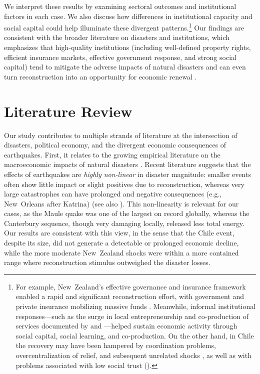 \documentclass[12pt]{article}
\begin{document}
We interpret these results by examining sectoral outcomes and institutional factors in each case. We also discuss how differences in institutional capacity and social capital could help illuminate these divergent patterns.\footnote{For example, New Zealand’s effective governance and insurance framework enabled a rapid and significant reconstruction effort, with government and private insurance mobilizing massive funds \parencite{parker2016five, poontirakul2017insurance}. Meanwhile, informal institutional responses—such as the surge in local entrepreneurship and co-production of services documented by \textcite{storr2017sandy} and \textcite{grube2018embedded}—helped sustain economic activity through social capital, social learning, and co-production. On the other hand, in Chile the recovery may have been hampered by coordination problems, overcentralization of relief, and subsequent unrelated shocks \parencite{eclac2010overview, cardenasjiron2012chilean, cardenas2018talca}, as well as with problems associated with low social trust (\cite{dussaillant2014trust}).} Our findings are consistent with the broader literature on disasters and institutions, which emphasizes that high-quality institutions (including well-defined property rights, efficient insurance markets, effective government response, and strong social capital) tend to mitigate the adverse impacts of natural disasters and can even turn reconstruction into an opportunity for economic renewal \autocite{skidmore2002does, raschky2008institutions, rayamajhee2022coproduction, storr2016community, rayamajhee2024shock}.

\section{Literature Review}
Our study contributes to multiple strands of literature at the intersection of disasters, political economy, and the divergent economic consequences of earthquakes. First, it relates to the growing empirical literature on the macroeconomic impacts of natural disasters \parencite{felbermayr2014disasters, loayza2012natural, porcelli2019impact, skidmore2002does}. Recent literature suggests that the effects of earthquakes are \textit{highly non-linear} in disaster magnitude: smaller events often show little impact or slight positives due to reconstruction, whereas very large catastrophes can have prolonged and negative consequences (e.g., New Orleans after Katrina) (see also \cite{barone2014natural, felbermayr2014disasters, boustan2020effect}). This non-linearity is relevant for our cases, as the Maule quake was one of the largest on record globally, whereas the Canterbury sequence, though very damaging locally, released less total energy. Our results are consistent with this view, in the sense that the Chile event, despite its size, did not generate a detectable or prolonged economic decline, while the more moderate New Zealand shocks were within a more contained range where reconstruction stimulus outweighed the disaster losses.
\end{document}
